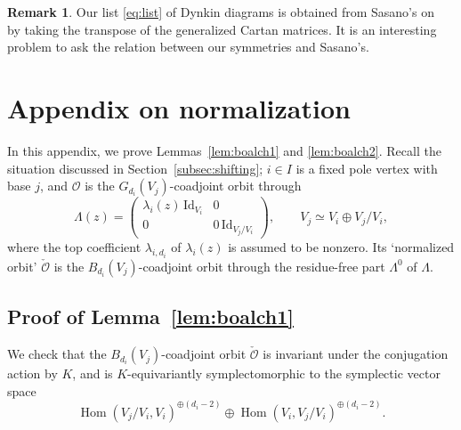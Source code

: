 \documentclass[pdftex]{sigma}
\numberwithin{equation}{section}
\theoremstyle{definition}
\newtheorem{Remark}[Theorem]{Remark}
\newcommand{\secref}[1]{Section~\ref{#1}}
\newcommand{\Hom}{\operatorname{Hom}}
\newcommand{\unit}{\mathrm{Id}}
\newcommand{\bO}{\mathcal{O}}
\begin{document}
\begin{Remark}\label{rem:sasano}
Our list \eqref{eq:list} of Dynkin diagrams
is obtained from Sasano's on~\cite[p.~352]{MR2493874}
by taking the transpose of the generalized Cartan matrices.
It is an interesting problem to ask
the relation between our symmetries and Sasano's.
\end{Remark}

\appendix
\section{Appendix on normalization}\label{app:misc}

In this appendix, we prove Lemmas~\ref{lem:boalch1} and \ref{lem:boalch2}.
Recall the situation discussed in \secref{subsec:shifting};
$i \in I$ is a f\/ixed pole vertex with base $j$, and
$\bO$ is the $G_{d_i}(V_j)$-coadjoint orbit through
\[
\Lambda(z)= \begin{pmatrix}
\lambda_i(z)\,\unit_{V_i} & 0 \\
0 & 0\,\unit_{V_j/V_i} \end{pmatrix},
\qquad V_j \simeq V_i \oplus V_j/V_i,
\]
where the top coef\/f\/icient $\lambda_{i,d_i}$ of $\lambda_i(z)$ is
assumed to be nonzero.
Its `normalized orbit' $\check{\bO}$ is the $B_{d_i}(V_j)$-coadjoint orbit
through the residue-free part $\Lambda^0$ of $\Lambda$.

\subsection{Proof of Lemma~\ref{lem:boalch1}}

We check that
the $B_{d_i}(V_j)$-coadjoint orbit $\check{\bO}$
is invariant under the conjugation action by $K$,
and is $K$-equivariantly
symplectomorphic to the symplectic vector space
\[
\Hom(V_j/V_i,V_i)^{\oplus (d_i-2)} \oplus \Hom(V_i,V_j/V_i)^{\oplus (d_i-2)}.
\]
\end{document}
